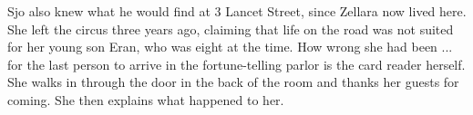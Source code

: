 Sjo also knew what he would find at 3 Lancet Street, since Zellara now lived here. She left the circus three years ago, claiming that life on the road was not suited for her young son Eran, who was eight at the time. How wrong she had been ... for the last person to arrive in the fortune-telling parlor is the card reader herself. She walks in through the door in the back of the room and thanks her guests for coming. She then explains what happened to her.\\

